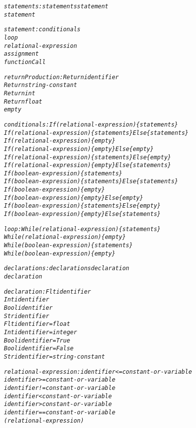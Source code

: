 \documentclass[12pt]{report}
\begin{document}
\begin{alltt}
     \textit{statements: statements statement}
          \textit{statement}

     \textit{statement: conditionals}
          \textit{loop}
          \textit{relational-expression}
          \textit{assignment}
          \textit{functionCall}

     \textit{returnProduction: Return identifier}
          \textit{Return string-constant}
          \textit{Return int}
          \textit{Return float}
          \textit{empty}

     \textit{conditionals: If ( relational-expression ) \{ statements \}}
          \textit{If ( relational-expression ) \{ statements \} Else \{ statements \}}
          \textit{If ( relational-expression ) \{ empty \}}
          \textit{If ( relational-expression ) \{ empty \} Else \{ empty \}}
          \textit{If ( relational-expression ) \{ statements \} Else \{ empty \}}
          \textit{If ( relational-expression ) \{ empty \} Else \{ statements \}}
          \textit{If ( boolean-expression ) \{ statements \}}
          \textit{If ( boolean-expression ) \{ statements \} Else \{ statements \}}
          \textit{If ( boolean-expression ) \{ empty \}}
          \textit{If ( boolean-expression ) \{ empty \} Else \{ empty \}}
          \textit{If ( boolean-expression ) \{ statements \} Else \{ empty \}}
          \textit{If ( boolean-expression ) \{ empty \} Else \{ statements \}}

     \textit{loop: While ( relational-expression ) \{ statements \}}
          \textit{While ( relational-expression ) \{ empty \}}
          \textit{While ( boolean-expression ) \{ statements \}}
          \textit{While ( boolean-expression ) \{ empty \}}

     \textit{declarations: declarations declaration}
          \textit{declaration}

     \textit{declaration: Flt identifier}
          \textit{Int identifier}
          \textit{Bool identifier}
          \textit{Str identifier}
          \textit{Flt identifier = float}
          \textit{Int identifier = integer}
          \textit{Bool identifier = True}
          \textit{Bool identifier = False}
          \textit{Str identifier = string-constant}

     \textit{relational-expression: identifier <= constant-or-variable}
          \textit{identifier >= constant-or-variable}
          \textit{identifier != constant-or-variable}
          \textit{identifier < constant-or-variable}
          \textit{identifier > constant-or-variable}
          \textit{identifier == constant-or-variable}
          \textit{( relational-expression )}


\end{alltt}
\end{document}
